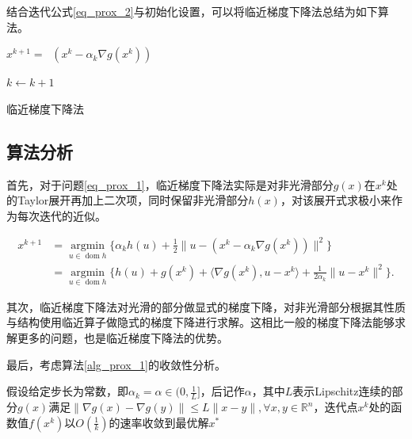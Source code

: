 结合迭代公式\ref{eq_prox_2}与初始化设置，可以将临近梯度下降法总结为如下算法。

\begin{algorithm}\label{alg_prox_1}

    \SetAlgoLined

     {
        $x^{k+1} = \mathop{\mathrm{prox_{\alpha_{k} h}}}(x^{k} - \alpha_{k}\nabla g(x^{k}))$

        $k \leftarrow k+1$
    }
    \caption{临近梯度下降法}
\end{algorithm}

\subsection{算法分析}

首先，对于问题\ref{eq_prox_1}，临近梯度下降法实际是对非光滑部分$g(x)$在$x^{k}$处的Taylor展开再加上二次项，同时保留非光滑部分$h(x)$，对该展开式求极小来作为每次迭代的近似。

\begin{equation}
    \begin{split}
        x^{k+1} &=  \mathop{\mathrm{argmin}}\limits_{u\in \mathop{\mathrm{dom}} h}\{\alpha_{k}h(u) + \frac{1}{2}\|u-(x^{k}-\alpha_{k}\nabla g(x^{k}))\|^{2}\} \\
                &= \mathop{\mathrm{argmin}}\limits_{u\in \mathop{\mathrm{dom}} h} \{h(u)+g(x^{k})+\langle \nabla g(x^{k}), u-x^{k} \rangle + \frac{1}{2\alpha_{k}}\|u-x^{k}\|^{2}\}.
    \end{split}
\end{equation}

其次，临近梯度下降法对光滑的部分做显式的梯度下降，对非光滑部分根据其性质与结构使用临近算子做隐式的梯度下降进行求解。这相比一般的梯度下降法能够求解更多的问题，也是临近梯度下降法的优势。

最后，考虑算法\ref{alg_prox_1}的收敛性分析。

\begin{theorem}
    假设给定步长为常数，即$\alpha_{k}=\alpha\in (0, \frac{1}{L}]$，后记作$\alpha$，其中$L$表示Lipschitz连续的部分$g(x)$满足$\|\nabla g(x)-\nabla g(y)\| \leq L\|x-y\|, \forall x, y \in \mathbb{R}^{n}$，迭代点$x^{k}$处的函数值$f(x^{k})$以$O(\frac{1}{k})$的速率收敛到最优解$x^{*}$
\end{theorem}


